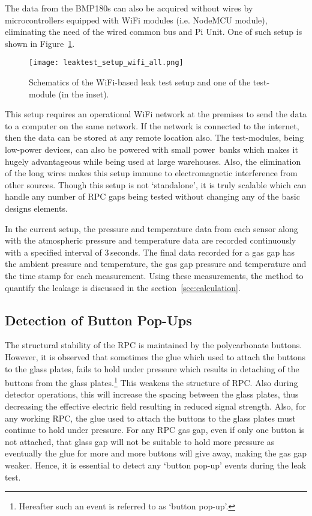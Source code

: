 The data from the BMP180s can also be acquired without wires by microcontrollers equipped with WiFi modules (i.e. NodeMCU module\cite{nodemcu2015}), eliminating the need of the wired common bus and Pi Unit. One of such setup is shown in Figure~\ref{fig:leakwifi}. 
\begin{figure}
  \centering
  \texttt{[image: leaktest\_setup\_wifi\_all.png]}
  \caption{Schematics of the WiFi-based leak test setup and one of the test-module (in the inset).}
  \label{fig:leakwifi}
\end{figure}
This setup requires an operational WiFi network at the premises to send the data to a computer on the same network. If the network is connected to the internet, then the data can be stored at any remote location also. The test-modules, being low-power devices, can also be powered with small power~banks which makes it hugely advantageous while being used at large warehouses. Also, the elimination of the long wires makes this setup immune to electromagnetic interference from other sources. Though this setup is not `standalone', it is truly scalable which can handle any number of RPC gaps being tested without changing any of the basic designs elements.

In the current setup, the pressure and temperature data from each sensor along with the atmospheric pressure and temperature data are recorded continuously with a specified interval of $3$\,seconds. The final data recorded for a gas gap has the ambient pressure and temperature, the gas gap pressure and temperature and the time stamp for each measurement. Using these measurements, the method to quantify the leakage is discussed in the section~\ref{sec:calculation}.

\subsection{Detection of Button Pop-Ups}\label{sec:button}
The structural stability of the RPC is maintained by the polycarbonate buttons. However, it is observed that sometimes the glue which used to attach the buttons to the glass plates, fails to hold under pressure which results in detaching of the buttons from the glass plates.\footnote{Hereafter such an event is referred to as `button pop-up'.} This weakens the structure of RPC. Also during detector operations, this will increase the spacing between the glass plates, thus decreasing the effective electric field resulting in reduced signal strength. Also, for any working RPC, the glue used to attach the buttons to the glass plates must continue to hold under pressure. For any RPC gas gap, even if only one button is not attached, that glass gap will not be suitable to hold more pressure as eventually the glue for more and more buttons will give away, making the gas gap weaker. Hence, it is essential to detect any `button pop-up' events during the leak test.

